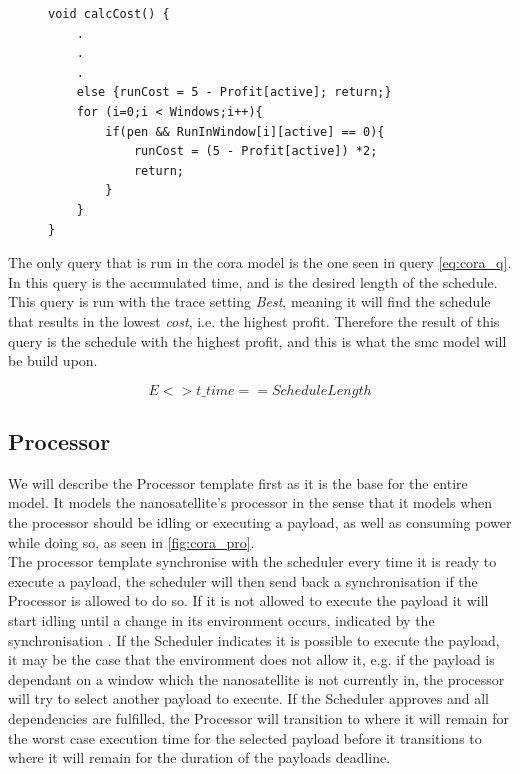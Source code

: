 \begin{figure}[h]
	\begin{lstlisting}[language=my_c, caption={Function calcCost(), used for calculating the cost rate}, label=lst:calcCost]
void calcCost() {
	.
	.
	.
	else {runCost = 5 - Profit[active]; return;}
	for (i=0;i < Windows;i++){ 
		if(pen && RunInWindow[i][active] == 0){
			runCost = (5 - Profit[active]) *2;
			return;
		} 
	}
}	
	\end{lstlisting}
\end{figure}


The only query that is run in the \gls{cora} model is the one seen in query \ref{eq:cora_q}.
In this query  is the accumulated time, and  is the desired length of the schedule.
This query is run with the trace setting \textit{Best}, meaning it will find the schedule that results in the lowest \textit{cost}, i.e. the highest profit.
Therefore the result of this query is the schedule with the highest profit, and this is what the \gls{smc} model will be build upon.

\begin{equation} \label{eq:cora_q}
E<> t\_time == ScheduleLength
\end{equation}

\subsection{Processor} \label{ssec:cora_pro}
We will describe the Processor template first as it is the base for the entire model.
It models the nanosatellite's processor in the sense that it models when the processor should be idling or executing a payload, as well as consuming power while doing so, as seen in \cref{fig:cora_pro}.\\
The processor template synchronise with the scheduler every time it is ready to execute a payload, the scheduler will then send back a synchronisation if the Processor is allowed to do so.
If it is not allowed to execute the payload it will start idling until a change in its environment occurs, indicated by the synchronisation .
If the Scheduler indicates it is possible to execute the payload, it may be the case that the environment does not allow it, e.g. if the payload is dependant on a window which the nanosatellite is not currently in, the processor will try to select another payload to execute.
If the Scheduler approves and all dependencies are fulfilled, the Processor will transition to  where it will remain for the worst case execution time for the selected payload before it transitions to  where it will remain for the duration of the payloads deadline.

